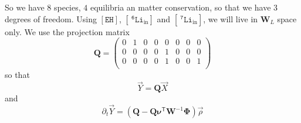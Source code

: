 \documentclass[aps,onecolumn,11pt]{revtex4}
\newcommand{\mychem}[1]{\mathtt{#1}}
\newcommand{\myconc}[1]{\left\lbrack{#1}\right\rbrack}
\newcommand{\spLi}[1]{{~^{\mychem{#1}}\mychem{Li}}}
\newcommand{\spLiIn}[1]{{\spLi{#1}}_{\mathrm{in}}}
\newcommand{\LiIn}[1]{\myconc{\spLiIn{#1}}}
\newcommand{\spEHin}{\mychem{EH}}
\newcommand{\EHin}{\myconc{\spEHin}}
\newcommand{\mytrn}[1]{{#1}^{\!\mathsf{T}}}
\newcommand{\mymat}[1]{{\bm{#1}}}
\begin{document}
So we have $8$ species, $4$ equilibria an matter conservation, so that we have 3 degrees of freedom.
Using $\EHin$, $\LiIn{6}$ and $\LiIn{7}$, we will live in $\mymat{W}_L$ space only.
We use the projection matrix
\begin{equation}
	\mymat{Q} = 
	\begin{pmatrix}
	0 & 1 & 0 & 0 &0 & 0 & 0 & 0\\
	0 & 0 & 0 & 0 &1 & 0 & 0 & 0\\
	0 & 0 & 0 & 0 &1 & 0 & 0 & 1\\
	\end{pmatrix}
\end{equation}
so that
\begin{equation}
	\vec{Y} = \mymat{Q}\vec{X}
\end{equation}
and
\begin{equation}
	\partial_t \vec{Y} = 
	\left(
	\mymat{Q} - \mymat{Q} \mytrn{\mymat{\nu}} \mymat{W}^{-1} \mymat{\Phi} \right)
	 \vec{\rho}
\end{equation}
\end{document}
